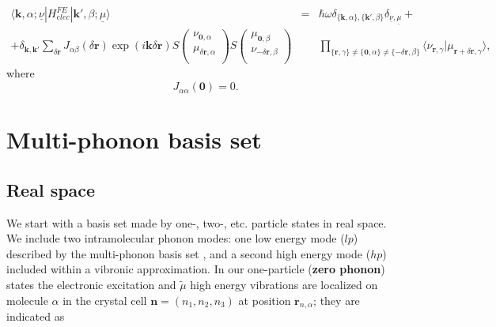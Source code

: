 \documentclass[pt12]{article}
\newcommand{\bfk}{\mathbf{k}}
\newcommand{\bfr}{\mathbf{r}}
\newcommand{\bfn}{\mathbf{n}}
\newcommand{\tmu}{\tilde{\mu}}
\begin{document}
\begin{eqnarray}\label{Matrix_elements_elec_nm}
\langle \bfk,\alpha ; \underline{\nu} | H^{FE}_{elec} | \bfk',\beta ;
\underline{\mu} \rangle &=& \hbar \omega
\delta_{\{\bfk,\alpha\},\{\bfk',\beta\}} \delta_{\underline{\nu},
\underline{\mu}} + \\
\nonumber
 + \delta_{\bfk,\bfk'} \sum_{\delta\bfr}
J_{\alpha\beta}(\delta\bfr) \exp(i\bfk\delta\bfr)
 S\left(
                                  \begin{array}{c}
                                    \nu_{\textbf{0},\alpha} \\
                                    \mu_{\delta\bfr,\alpha} \\
                                  \end{array}
                                \right)
 S\left(
                                \begin{array}{c}
                                    \mu_{\textbf{0},\beta} \\
                                    \nu_{-\delta\bfr,\beta} \\
                                  \end{array}
                                \right)
& & \prod_{\{\bfr,\gamma\} \neq \{\textbf{0},\alpha\} \neq
\{-\delta\bfr,\beta\}} \langle
\nu_{\bfr,\gamma}|\mu_{\bfr+\delta\bfr,\gamma} \rangle,
\end{eqnarray}
where
\begin{equation}\label{delta_n_def}
J_{\alpha\alpha}(\textbf{0})=0.
\end{equation}

\section{Multi-phonon basis set}

\subsection{Real space}

We start with a basis set made by one-, two-, etc. particle states in real space. We include two intramolecular phonon modes: one low energy mode ($lp$) described by the multi-phonon basis set , and a second high energy mode ($hp$) included within a vibronic approximation. In our one-particle (\textbf{zero phonon}) states the electronic excitation and $\tmu$ high energy vibrations are localized on molecule $\alpha$ in the crystal cell $\bfn=(n_1,n_2,n_3)$ at position $\textbf{r}_{n,\alpha}$; they are
indicated as
\end{document}
